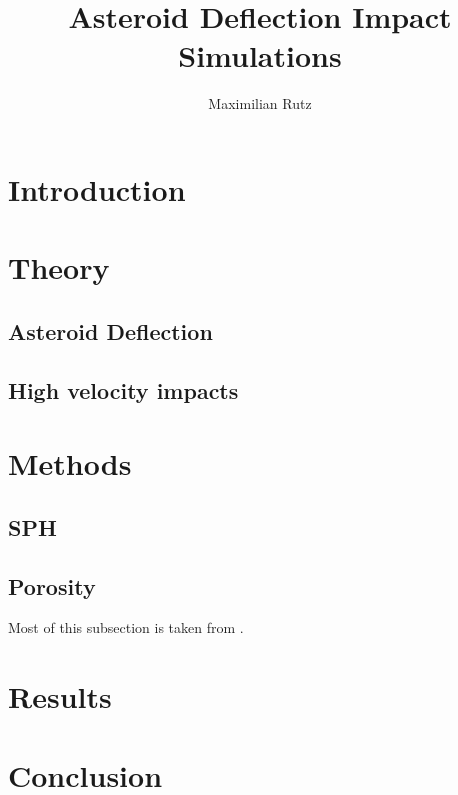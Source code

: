 \documentclass{article}
\title{Asteroid Deflection Impact Simulations}
\author{Maximilian Rutz}
\date{}
\begin{document}
	\maketitle
	\begin{abstract}
	 
	\end{abstract}
	
	\newpage
	\tableofcontents
	 
	\newpage
	\section{Introduction} 
	\section{Theory}
		\subsection{Asteroid Deflection}
		\subsection{High velocity impacts}
	\section{Methods}
		\subsection{SPH}
		\subsection{Porosity}
		Most of this subsection is taken from \cite{Jutzi_p_alpha_1}.		 
	\section{Results}
	\section{Conclusion}
	
	\newpage 
	\printbibliography
 
\end{document}
